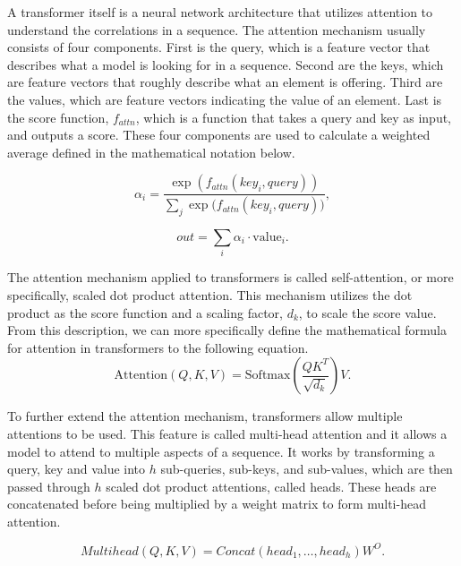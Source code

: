 \documentclass[peerreview]{IEEEtran}
\begin{document}
A transformer itself is a neural network architecture that utilizes attention to understand the correlations in a sequence. The attention mechanism usually consists of four components. First is the query, which is a feature vector that describes what a model is looking for in a sequence. Second are the keys, which are feature vectors that roughly describe what an element is offering. Third are the values, which are feature vectors indicating the value of an element. Last is the score function, $f_{attn}$, which is a function that takes a query and key as input, and outputs a score. These four components are used to calculate a weighted average defined in the mathematical notation below.

$$
\alpha_i = \frac{\exp(f_{attn}(key_i, query))}{\sum_j{\exp(f_{attn}(key_i, query)})}, 
$$

$$
out=\sum_i{\alpha_i \cdot \text{value}_i}.
$$

The attention mechanism applied to transformers is called self-attention, or more specifically, scaled dot product attention. This mechanism utilizes the dot product as the score function and a scaling factor, $d_k$, to scale the score value. From this description, we can more specifically define the mathematical formula for attention in transformers to the following equation.
$$
\textrm{Attention}(Q, K, V) = \textrm{Softmax}(\frac{QK^T}{\sqrt{d_k}})V.
$$

To further extend the attention mechanism, transformers allow multiple attentions to be used. This feature is called multi-head attention and it allows a model to attend to multiple aspects of a sequence. It works by transforming a query, key and value into $h$ sub-queries, sub-keys, and sub-values, which are then passed through $h$ scaled dot product attentions, called heads. These heads are concatenated before being multiplied by a weight matrix to form multi-head attention. 

$$
Multihead(Q, K, V) = Concat(head_1, \dots, head_h)W^O.
$$
\end{document}
